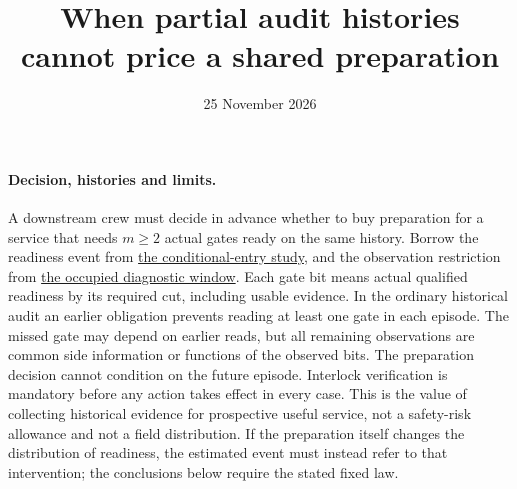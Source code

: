 \documentclass[11pt]{article}
\title{When partial audit histories cannot price a shared preparation}
\date{25 November 2026}
\begin{document}
\maketitle
\paragraph{Decision, histories and limits.}
A downstream crew must decide in advance whether to buy preparation for a service that needs \(m\geq2\) actual gates ready on the same history. Borrow the readiness event from
\href{https://github.com/eternal-november/eos-research-programmes/pull/446}{the conditional-entry study}, and the observation restriction from
\href{https://github.com/eternal-november/eos-research-programmes/pull/398}{the occupied diagnostic window}. Each gate bit means actual qualified readiness by its required cut, including usable evidence. In the ordinary historical audit an earlier obligation prevents reading at least one gate in each episode. The missed gate may depend on earlier reads, but all remaining observations are common side information or functions of the observed bits. The preparation decision cannot condition on the future episode. Interlock verification is mandatory before any action takes effect in every case. This is the value of collecting historical evidence for prospective useful service, not a safety-risk allowance and not a field distribution. If the preparation itself changes the distribution of readiness, the estimated event must instead refer to that intervention; the conclusions below require the stated fixed law.
\end{document}
